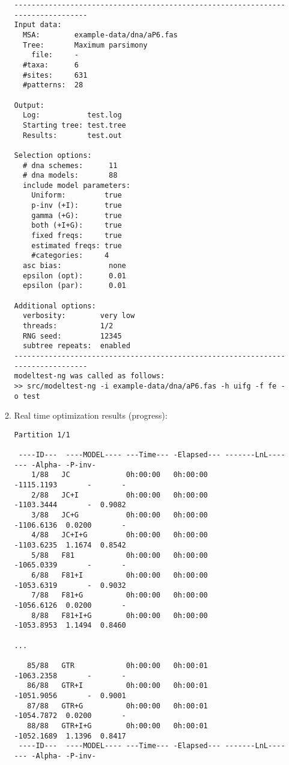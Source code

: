 \begin{enumerate}
\begin{enumerate}
\begin{lstlisting}
--------------------------------------------------------------------------------
Input data:
  MSA:        example-data/dna/aP6.fas
  Tree:       Maximum parsimony
    file:     -
  #taxa:      6
  #sites:     631
  #patterns:  28

Output:
  Log:           test.log
  Starting tree: test.tree
  Results:       test.out

Selection options:
  # dna schemes:      11
  # dna models:       88
  include model parameters:
    Uniform:         true
    p-inv (+I):      true
    gamma (+G):      true
    both (+I+G):     true
    fixed freqs:     true
    estimated freqs: true
    #categories:     4
  asc bias:           none
  epsilon (opt):      0.01
  epsilon (par):      0.01

Additional options:
  verbosity:        very low
  threads:          1/2
  RNG seed:         12345
  subtree repeats:  enabled
--------------------------------------------------------------------------------
modeltest-ng was called as follows:
>> src/modeltest-ng -i example-data/dna/aP6.fas -h uifg -f fe -o test
\end{lstlisting}

\item Real time optimization results (progress):

\begin{lstlisting}
Partition 1/1

 ----ID---  ----MODEL---- ---Time--- -Elapsed--- -------LnL------- -Alpha- -P-inv-
    1/88   JC             0h:00:00   0h:00:00           -1115.1193       -       -
    2/88   JC+I           0h:00:00   0h:00:00           -1103.3444       -  0.9082
    3/88   JC+G           0h:00:00   0h:00:00           -1106.6136  0.0200       -
    4/88   JC+I+G         0h:00:00   0h:00:00           -1103.6235  1.1674  0.8542
    5/88   F81            0h:00:00   0h:00:00           -1065.0339       -       -
    6/88   F81+I          0h:00:00   0h:00:00           -1053.6319       -  0.9032
    7/88   F81+G          0h:00:00   0h:00:00           -1056.6126  0.0200       -
    8/88   F81+I+G        0h:00:00   0h:00:00           -1053.8953  1.1494  0.8460

...

   85/88   GTR            0h:00:00   0h:00:01           -1063.2358       -       -
   86/88   GTR+I          0h:00:00   0h:00:01           -1051.9056       -  0.9001
   87/88   GTR+G          0h:00:00   0h:00:01           -1054.7872  0.0200       -
   88/88   GTR+I+G        0h:00:00   0h:00:01           -1052.1689  1.1396  0.8417
 ----ID---  ----MODEL---- ---Time--- -Elapsed--- -------LnL------- -Alpha- -P-inv-


\end{lstlisting}
\end{enumerate}
\end{enumerate}

